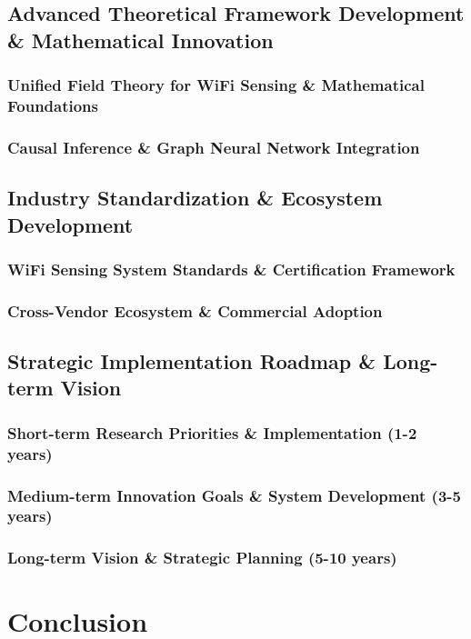 \documentclass[journal]{IEEEtran}
\begin{document}
{\subsection{Advanced Theoretical Framework Development \& Mathematical Innovation}
\subsubsection{Unified Field Theory for WiFi Sensing \& Mathematical Foundations}
\subsubsection{Causal Inference \& Graph Neural Network Integration}

\subsection{Industry Standardization \& Ecosystem Development}
\subsubsection{WiFi Sensing System Standards \& Certification Framework}
\subsubsection{Cross-Vendor Ecosystem \& Commercial Adoption}

\subsection{Strategic Implementation Roadmap \& Long-term Vision}
\subsubsection{Short-term Research Priorities \& Implementation (1-2 years)}
\subsubsection{Medium-term Innovation Goals \& System Development (3-5 years)}
\subsubsection{Long-term Vision \& Strategic Planning (5-10 years)}

\section{Conclusion}
\label{sec:conclusion}

}
\end{document}
